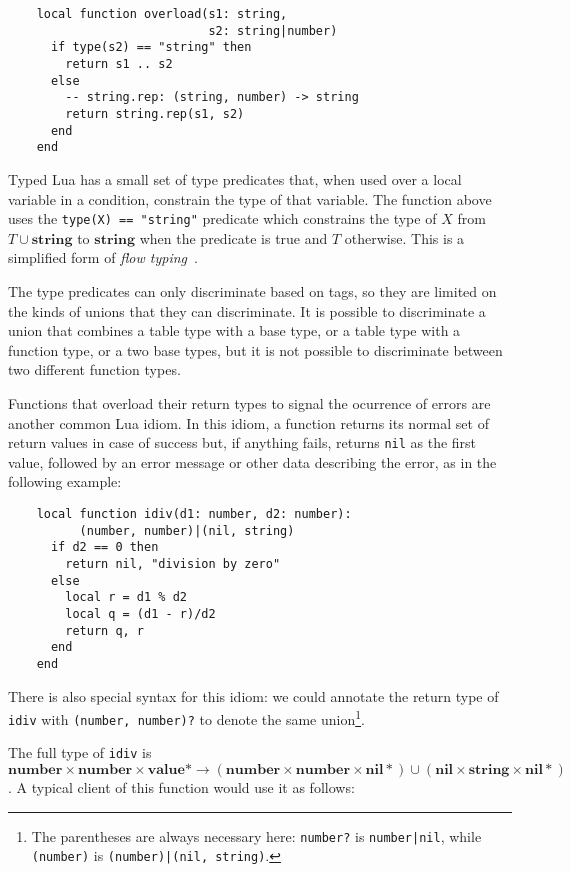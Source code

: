 \documentclass[preprint]{sig-alternate}
\newcommand{\Top}{\mathbf{value}}
\newcommand{\Nil}{\mathbf{nil}}
\newcommand{\Number}{\mathbf{number}}
\newcommand{\String}{\mathbf{string}}
\begin{document}
\begin{verbatim}
    local function overload(s1: string, 
                            s2: string|number)
      if type(s2) == "string" then
        return s1 .. s2
      else
        -- string.rep: (string, number) -> string
        return string.rep(s1, s2)
      end
    end
\end{verbatim}

Typed Lua has a small set of type predicates that, when used
over a local variable in a condition, constrain the type of that
variable. The function above uses the {\tt type(X) == "string"}
predicate which constrains the type of $X$ from $T \cup \String$ to
$\String$ when the predicate is true and $T$ otherwise. This is
a simplified form of {\em flow typing}~\cite{guha:flow}.

The type predicates can only discriminate based on tags, so they
are limited on the kinds of unions that they can discriminate. It
is possible to discriminate a union that combines a table type with
a base type, or a table type with a function type, or a two base types,
but it is not possible to discriminate between two different function
types.

Functions that overload their return types to signal the ocurrence
of errors are another common Lua idiom. In this idiom, a function
returns its normal set of return values in case of success but,
if anything fails, returns {\tt nil} as the first value, followed
by an error message or other data describing the error, as in the
following example:

\begin{verbatim}
    local function idiv(d1: number, d2: number):
          (number, number)|(nil, string)
      if d2 == 0 then
        return nil, "division by zero"
      else
        local r = d1 % d2
        local q = (d1 - r)/d2
        return q, r
      end
    end
\end{verbatim}

There is also special syntax for this idiom: we could
annotate the return type of {\tt idiv} with {\tt (number, number)?}
to denote the same union\footnote{The parentheses are always
necessary here: {\tt number?} is {\tt number|nil}, while {\tt (number)}
is {\tt (number)|(nil, string)}.}. 

The full type of {\tt idiv} is $\Number \times \Number \times
\Top * \rightarrow (\Number \times \Number \times \Nil *) \cup
(\Nil \times \String \times \Nil *)$. A typical client of this
function would use it as follows:
\end{document}
